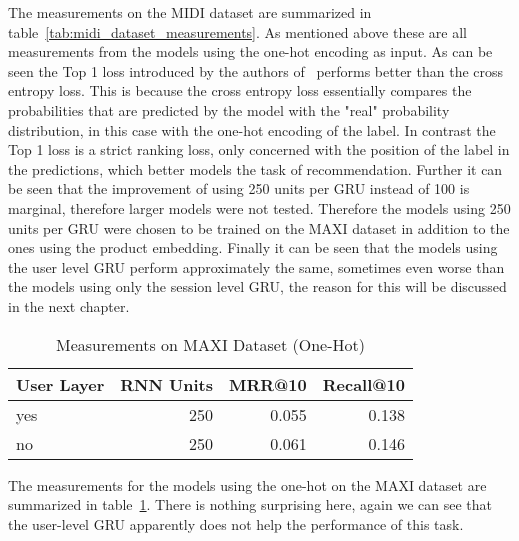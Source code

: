 The measurements on the MIDI dataset are summarized in table~\ref{tab:midi_dataset_measurements}.
As mentioned above these are all measurements from the models using the one-hot encoding as input.
As can be seen the Top 1 loss introduced by the authors of~\cite{gru4rec} performs better than the cross entropy loss.
This is because the cross entropy loss essentially compares the probabilities that are predicted by the model with the "real" probability distribution, in this case with the one-hot encoding of the label.
In contrast the Top 1 loss is a strict ranking loss, only concerned with the position of the label in the predictions, which better models the task of recommendation.
Further it can be seen that the improvement of using 250 units per GRU instead of 100 is marginal, therefore larger models were not tested.
Therefore the models using 250 units per GRU were chosen to be trained on the MAXI dataset in addition to the ones using the product embedding.
Finally it can be seen that the models using the user level GRU perform approximately the same, sometimes even worse than the models using only the session level GRU, the reason for this will be discussed in the next chapter.
\begin{table}[t]
    \centering
    \begin{tabular}{lrrr}\toprule
        \textbf{User Layer} & \textbf{RNN Units} & \textbf{MRR@10} & \textbf{Recall@10} \\ \midrule
        yes & 250 & 0.055 & 0.138 \\ 
        no & 250 & 0.061 & 0.146 \\ \bottomrule
    \end{tabular}
    \caption{Measurements on MAXI Dataset (One-Hot)}
    \label{tab:maxi_dataset_measurements_one_hot}
\end{table}
The measurements for the models using the one-hot on the MAXI dataset are summarized in table~\ref{tab:maxi_dataset_measurements_one_hot}.
There is nothing surprising here, again we can see that the user-level GRU apparently does not help the performance of this task.

